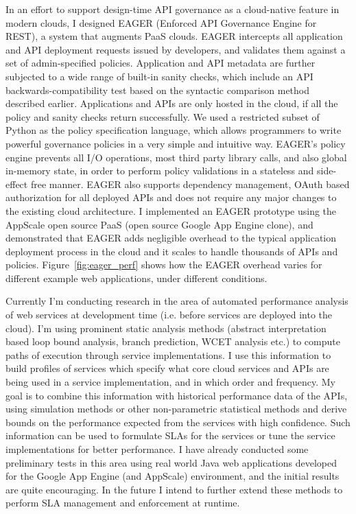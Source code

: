 In an effort to support design-time API governance as a cloud-native feature in 
modern clouds, I designed EAGER (Enforced API Governance Engine for REST), a 
system that augments PaaS clouds. EAGER intercepts all application and API 
deployment requests issued by developers, and validates them against a set of 
admin-specified policies. Application and API metadata are further subjected to a wide 
range of built-in sanity checks, which include an API backwards-compatibility test based 
on the syntactic comparison method described earlier. Applications and APIs are only 
hosted in the cloud, if all the policy and sanity checks return successfully. We used a 
restricted subset of Python as the policy specification language, which allows programmers 
to write powerful governance policies in a very simple and intuitive way. EAGER's policy engine 
prevents all I/O operations, most third party library calls, and also global in-memory state, in 
order to perform policy validations in a stateless and side-effect free manner. EAGER also 
supports dependency management, OAuth based authorization for all deployed APIs and does 
not require any major changes to the existing cloud architecture. I implemented an EAGER 
prototype using the AppScale open source PaaS (open source Google App Engine clone), 
and demonstrated that EAGER adds negligible overhead to the typical application deployment 
process in the cloud and it scales to handle thousands of APIs and policies. Figure~\ref{fig:eager_perf}
shows how the EAGER overhead varies for different example web applications, under different
conditions.

Currently I'm conducting research in the area of automated performance analysis of web
services at development time (i.e. before services are deployed into the cloud). I'm using
prominent static analysis methods (abstract interpretation based loop bound analysis,
branch prediction, WCET analysis etc.) to compute paths of execution through service 
implementations. I use this information to build profiles of services which
specify what core cloud services and APIs are being used in a service implementation,
and in which order and frequency. My goal is to combine this information with historical
performance data of the APIs, using simulation methods or other non-parametric statistical
methods and derive bounds on the performance expected from the services with high
confidence. 
Such information can be used to formulate SLAs for the services or tune
the service implementations for better performance. 
I have already conducted some preliminary tests in this area using real world
Java web applications developed for the Google App Engine (and AppScale) environment,
and the initial results are quite encouraging.
In the future I intend to further extend 
these methods to perform SLA management and enforcement at runtime.